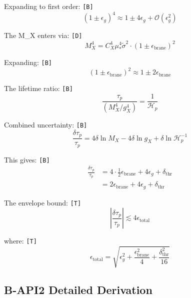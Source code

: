 \documentclass[11pt,a4paper]{article}
\newcommand{\tagD}{\textcolor{green!50!black}{\texttt{[D]}}}
\newcommand{\tagT}{\textcolor{cyan!70!black}{\texttt{[T]}}}
\newcommand{\tagB}{\textcolor{purple!70!black}{\texttt{[B]}}}
\theoremstyle{definition}
\begin{document}
Expanding to first order: \tagB{}
\begin{equation}
\label{eq:api1-expand}
(1 \pm \epsilon_g)^4 \approx 1 \pm 4\epsilon_g + \mathcal{O}(\epsilon_g^2)
\end{equation}

The M_X enters via: \tagD{}
\begin{equation}
\label{eq:api1-mx}
M_X^4 = C_X^4 \mu_*^4 \tilde{\sigma}^2 \cdot (1 \pm \epsilon_{\text{brane}})^2
\end{equation}

Expanding: \tagB{}
\begin{equation}
\label{eq:api1-mx-expand}
(1 \pm \epsilon_{\text{brane}})^2 \approx 1 \pm 2\epsilon_{\text{brane}}
\end{equation}

The lifetime ratio: \tagB{}
\begin{equation}
\label{eq:api1-ratio}
\frac{\tau_p}{(M_X^4/g_X^4)} = \frac{1}{\mathcal{H}_p}
\end{equation}

Combined uncertainty: \tagB{}
\begin{equation}
\label{eq:api1-unc-comb}
\frac{\delta\tau_p}{\tau_p} = 4\delta\ln M_X - 4\delta\ln g_X + \delta\ln\mathcal{H}_p^{-1}
\end{equation}

This gives: \tagB{}
\begin{align}
\label{eq:api1-unc-detail-1}
\frac{\delta\tau_p}{\tau_p} &= 4 \cdot \frac{1}{2}\epsilon_{\text{brane}} + 4\epsilon_g + \delta_{\text{thr}} \\
\label{eq:api1-unc-detail-2}
&= 2\epsilon_{\text{brane}} + 4\epsilon_g + \delta_{\text{thr}}
\end{align}

The envelope bound: \tagT{}
\begin{equation}
\label{eq:api1-envelope}
\left|\frac{\delta\tau_p}{\tau_p}\right| \lesssim 4\epsilon_{\text{total}}
\end{equation}

where: \tagT{}
\begin{equation}
\label{eq:api1-eps-total}
\epsilon_{\text{total}} = \sqrt{\epsilon_g^2 + \frac{\epsilon_{\text{brane}}^2}{4} + \frac{\delta_{\text{thr}}^2}{16}}
\end{equation}

\subsection{B-API2 Detailed Derivation}
\label{subsec:b-api2-detail}
\end{document}

